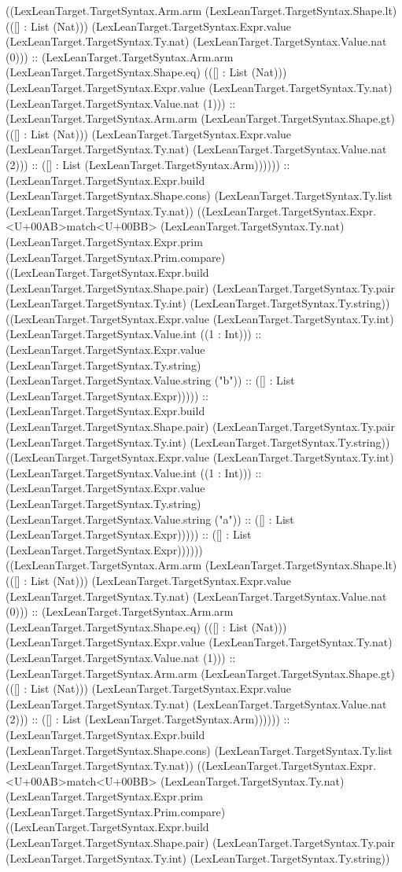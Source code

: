 \documentclass[11pt]{article}
\begin{document}
((LexLeanTarget.TargetSyntax.Arm.arm (LexLeanTarget.TargetSyntax.Shape.lt) (([] : List (Nat))) (LexLeanTarget.TargetSyntax.Expr.value (LexLeanTarget.TargetSyntax.Ty.nat) (LexLeanTarget.TargetSyntax.Value.nat (0))) :: (LexLeanTarget.TargetSyntax.Arm.arm (LexLeanTarget.TargetSyntax.Shape.eq) (([] : List (Nat))) (LexLeanTarget.TargetSyntax.Expr.value (LexLeanTarget.TargetSyntax.Ty.nat) (LexLeanTarget.TargetSyntax.Value.nat (1))) :: (LexLeanTarget.TargetSyntax.Arm.arm (LexLeanTarget.TargetSyntax.Shape.gt) (([] : List (Nat))) (LexLeanTarget.TargetSyntax.Expr.value (LexLeanTarget.TargetSyntax.Ty.nat) (LexLeanTarget.TargetSyntax.Value.nat (2))) :: ([] : List (LexLeanTarget.TargetSyntax.Arm)))))) :: (LexLeanTarget.TargetSyntax.Expr.build (LexLeanTarget.TargetSyntax.Shape.cons) (LexLeanTarget.TargetSyntax.Ty.list (LexLeanTarget.TargetSyntax.Ty.nat)) ((LexLeanTarget.TargetSyntax.Expr.<U+00AB>match<U+00BB> (LexLeanTarget.TargetSyntax.Ty.nat) (LexLeanTarget.TargetSyntax.Expr.prim (LexLeanTarget.TargetSyntax.Prim.compare) ((LexLeanTarget.TargetSyntax.Expr.build (LexLeanTarget.TargetSyntax.Shape.pair) (LexLeanTarget.TargetSyntax.Ty.pair (LexLeanTarget.TargetSyntax.Ty.int) (LexLeanTarget.TargetSyntax.Ty.string)) ((LexLeanTarget.TargetSyntax.Expr.value (LexLeanTarget.TargetSyntax.Ty.int) (LexLeanTarget.TargetSyntax.Value.int ((1 : Int))) :: (LexLeanTarget.TargetSyntax.Expr.value (LexLeanTarget.TargetSyntax.Ty.string) (LexLeanTarget.TargetSyntax.Value.string ("b")) :: ([] : List (LexLeanTarget.TargetSyntax.Expr))))) :: (LexLeanTarget.TargetSyntax.Expr.build (LexLeanTarget.TargetSyntax.Shape.pair) (LexLeanTarget.TargetSyntax.Ty.pair (LexLeanTarget.TargetSyntax.Ty.int) (LexLeanTarget.TargetSyntax.Ty.string)) ((LexLeanTarget.TargetSyntax.Expr.value (LexLeanTarget.TargetSyntax.Ty.int) (LexLeanTarget.TargetSyntax.Value.int ((1 : Int))) :: (LexLeanTarget.TargetSyntax.Expr.value (LexLeanTarget.TargetSyntax.Ty.string) (LexLeanTarget.TargetSyntax.Value.string ("a")) :: ([] : List (LexLeanTarget.TargetSyntax.Expr))))) :: ([] : List (LexLeanTarget.TargetSyntax.Expr)))))) ((LexLeanTarget.TargetSyntax.Arm.arm (LexLeanTarget.TargetSyntax.Shape.lt) (([] : List (Nat))) (LexLeanTarget.TargetSyntax.Expr.value (LexLeanTarget.TargetSyntax.Ty.nat) (LexLeanTarget.TargetSyntax.Value.nat (0))) :: (LexLeanTarget.TargetSyntax.Arm.arm (LexLeanTarget.TargetSyntax.Shape.eq) (([] : List (Nat))) (LexLeanTarget.TargetSyntax.Expr.value (LexLeanTarget.TargetSyntax.Ty.nat) (LexLeanTarget.TargetSyntax.Value.nat (1))) :: (LexLeanTarget.TargetSyntax.Arm.arm (LexLeanTarget.TargetSyntax.Shape.gt) (([] : List (Nat))) (LexLeanTarget.TargetSyntax.Expr.value (LexLeanTarget.TargetSyntax.Ty.nat) (LexLeanTarget.TargetSyntax.Value.nat (2))) :: ([] : List (LexLeanTarget.TargetSyntax.Arm)))))) :: (LexLeanTarget.TargetSyntax.Expr.build (LexLeanTarget.TargetSyntax.Shape.cons) (LexLeanTarget.TargetSyntax.Ty.list (LexLeanTarget.TargetSyntax.Ty.nat)) ((LexLeanTarget.TargetSyntax.Expr.<U+00AB>match<U+00BB> (LexLeanTarget.TargetSyntax.Ty.nat) (LexLeanTarget.TargetSyntax.Expr.prim (LexLeanTarget.TargetSyntax.Prim.compare) ((LexLeanTarget.TargetSyntax.Expr.build (LexLeanTarget.TargetSyntax.Shape.pair) (LexLeanTarget.TargetSyntax.Ty.pair (LexLeanTarget.TargetSyntax.Ty.int) (LexLeanTarget.TargetSyntax.Ty.string)) 
\end{document}
